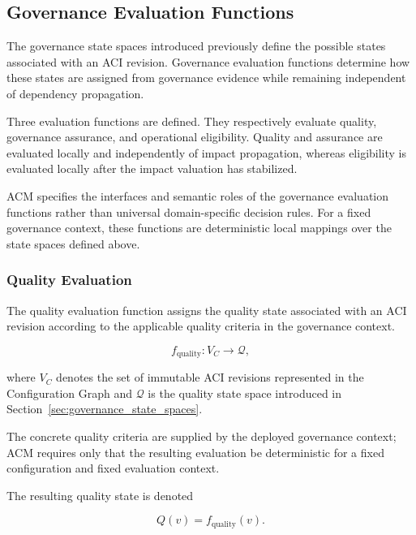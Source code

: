 \documentclass[10pt]{article}
\begin{document}
\subsection{Governance Evaluation Functions}
\label{sec:evaluation_functions}

The governance state spaces introduced previously define the possible states associated with an ACI revision. Governance evaluation functions determine how these states are assigned from governance evidence while remaining independent of dependency propagation.

Three evaluation functions are defined. They respectively evaluate quality,
governance assurance, and operational eligibility. Quality and assurance are evaluated locally and independently of impact propagation, whereas eligibility is evaluated locally after the impact valuation has
stabilized.

ACM specifies the interfaces and semantic roles of the governance evaluation functions rather than universal domain-specific decision rules. For a fixed governance context, these functions are deterministic local mappings over the state spaces defined above.

\subsubsection{Quality Evaluation}

The quality evaluation function assigns the quality state associated with an ACI revision according to the applicable quality criteria in the governance context.

\begin{equation}
	f_{\mathrm{quality}} : V_C \rightarrow \mathcal{Q},
	\label{eq:f_quality}
\end{equation}

where $V_C$ denotes the set of immutable ACI revisions represented in the Configuration Graph and $\mathcal{Q}$ is the quality state space introduced in Section~\ref{sec:governance_state_spaces}.

The concrete quality criteria are supplied by the deployed governance context; ACM requires only that the resulting evaluation be deterministic for a fixed configuration and fixed evaluation context.

The resulting quality state is denoted

\begin{equation}
	Q(v)=f_{\mathrm{quality}}(v).
	\label{eq:quality_assignment}
\end{equation}
\end{document}
